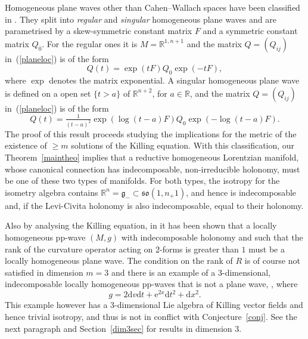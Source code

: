 \documentclass[11pt,a4paper]{amsart}
\newcommand{\g}{\mathfrak{g}}
\newcommand{\+}{\oplus}
\newcommand{\so}{\mathfrak{so}}
\newcommand{\1}{\mathbf{1}}
\newcommand{\e}{\mathrm{e}}
\renewcommand{\d}{\mathrm{d}}
\newcommand{\R}{\mathbb{R}} %
\newcommand{\<}{\langle}
\renewcommand{\>}{\rangle}
\theoremstyle{definition}
\theoremstyle{plain}
\numberwithin{equation}{section}
\begin{document}
Homogeneous plane waves other than Cahen--Wallach spaces have been classified in \cite{blau-oloughlin03}. They split into {\em regular} and {\em singular} homogeneous plane waves and are parametrised by  a skew-symmetric constant matrix $F$ and  a symmetric constant matrix $Q_0$. For the regular ones it is $M=\R^{1,n+1}$ and the matrix  $Q=(Q_{ij})$ in~(\ref{planeloc}) is of the form
\[
Q(t)=\exp(t F) Q_0 \exp(-t F),
\]
where $\exp$ denotes the matrix exponential.
A singular homogeneous plane wave is defined on a open set $\{ t>a\}$ of $\R^{n+2}$, for  $a\in \R$, and the matrix  $Q=(Q_{ij})$ in~(\ref{planeloc}) is of the form
\[
Q(t)=\tfrac{1}{(t-a)^2} \exp(\log(t-a)  F) Q_0 \exp(-\log(t-a)  F).
\]
The proof of this result proceeds studying the implications for the metric of the existence of $\ge m$ solutions of  the Killing equation. 
With this classification, our Theorem~\ref{maintheo} implies that a reductive homogeneous Lorentzian manifold, whose canonical connection has indecomposable, non-irreducible holonomy, must  be one of these two types of manifolds. For both types, the isotropy for the isometry algebra contains $\R^n=\g_-\subset \so(1,n_+1)$, and hence is indecomposable and, if the Levi-Civita holonomy is also indecomposable, equal to their holonomy. 


Also by analysing the Killing equation, in \cite{GlobkeLeistner16} it has been shown that a locally homogeneous pp-wave $(M,g)$ with indecomposable holonomy and such that the rank of the curvature operator acting on $2$-forms is greater than $1$ must be a locally homogeneous plane wave. The condition on the rank of $R$ is of course not satisfied in dimension $m=3$ and there is an example of a $3$-dimensional, indecomposable locally homogeneous pp-waves that is not a plane wave, \cite[Example 4.1]{GlobkeLeistner16}, where 
\[g=2\d v \d t  +\e^{2 x}\d t ^2 +\d x^2.\]
This example however has a $3$-dimensional Lie algebra of Killing vector fields and hence trivial isotropy, and thus is not in conflict with  Conjecture~\ref{conj}. See the next paragraph  and  Section~\ref{dim3sec} for results in dimension $3$.
\end{document}
